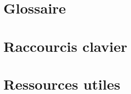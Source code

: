 \documentclass[11pt,a4paper,oneside]{book}
\begin{document}
% 
% 
% 

% 
% 

\appendix
\chapter{Glossaire}
\chapter{Raccourcis clavier}
\chapter{Ressources utiles}

% 
% 

\end{document}
